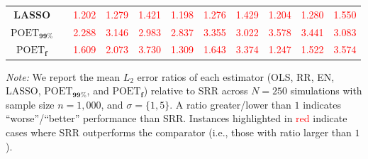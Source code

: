 \begin{table}[ht!]
{\begin{tabular*}{\textwidth}{@{\extracolsep{\fill}}ccccccccccc@{}}
\textbf{LASSO} &  & \textcolor{red}{1.202} & \textcolor{red}{1.279} & \textcolor{red}{1.421} & \textcolor{red}{1.198} & \textcolor{red}{1.276} & \textcolor{red}{1.429} & \textcolor{red}{1.204} & \textcolor{red}{1.280} & \textcolor{red}{1.550} \\
\textbf{$\text{POET}_{\bm{99\%}}$} &  & \textcolor{red}{2.288} & \textcolor{red}{3.146} & \textcolor{red}{2.983} & \textcolor{red}{2.837} & \textcolor{red}{3.355} & \textcolor{red}{3.022} & \textcolor{red}{3.578} & \textcolor{red}{3.441} & \textcolor{red}{3.083} \\
\textbf{$\text{POET}_{\bm{f}}$} &  & \textcolor{red}{1.609} & \textcolor{red}{2.073} & \textcolor{red}{3.730} & \textcolor{red}{1.309} & \textcolor{red}{1.643} & \textcolor{red}{3.374} & \textcolor{red}{1.247} & \textcolor{red}{1.522} & \textcolor{red}{3.574} \\
\bottomrule
\end{tabular*}%
}
\begin{tablenotes}[flushleft]
\footnotesize
\item \emph{Note:} We report the mean $L_2$ error ratios of each estimator (OLS, RR, EN, LASSO, $\text{POET}_{\bm{99\%}}$, and $\text{POET}_{\bm{f}}$) relative to SRR across $N = 250$ simulations with sample size $n = 1,000$, and $\sigma =\{1,5\}$. A ratio greater/lower than $1$ indicates ``worse''/``better'' performance than SRR. Instances highlighted in \textcolor{red}{red} indicate cases where SRR outperforms the comparator (i.e., those with ratio larger than $1$).
\end{tablenotes}
\end{table}
